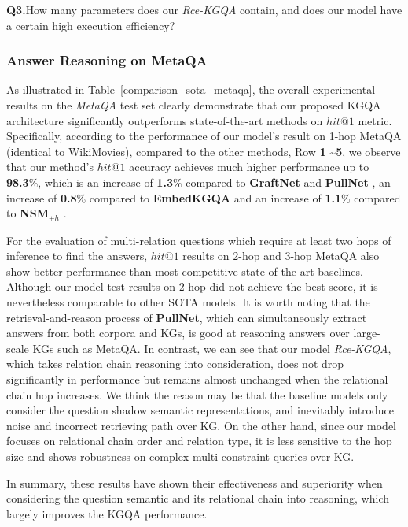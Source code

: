 \documentclass[pdflatex,sn-mathphys]{sn-jnl}%
\theoremstyle{thmstyleone}%
\theoremstyle{thmstyletwo}%
\theoremstyle{thmstylethree}%
\begin{document}
\textbf{Q3.}\quad How many parameters does our \textit{Rce-KGQA} contain, and does our model have a certain high execution efficiency?

\subsubsection{Answer Reasoning on MetaQA}
\label{ar_metaqa}
As illustrated in Table~\ref{comparison_sota_metaqa}, the overall experimental results on the \textit{MetaQA} test set clearly demonstrate that our proposed KGQA architecture significantly outperforms state-of-the-art methods on $hit@1$ metric. Specifically, according to the performance of our model's result on 1-hop MetaQA (identical to WikiMovies), compared to the other methods, Row \textbf{1} \textasciitilde \textbf{5}, we observe that our method's $hit@1$ accuracy achieves much higher performance up to \textbf{98.3}\%, which is an increase of \textbf{1.3}\% compared to \textbf{GraftNet} \cite{sun2018graftnet} and \textbf{PullNet} \cite{pullnet}, an increase of \textbf{0.8}\% compared to \textbf{EmbedKGQA} \cite{apoorv2020embedKGQA} and an increase of \textbf{1.1}\% compared to \textbf{NSM}$_{+h}$ \cite{he2021stu-teaQA}.

For the evaluation of multi-relation questions which require at least two hops of inference to find the answers, $hit@1$ results on 2-hop and 3-hop MetaQA also show better performance than most competitive state-of-the-art baselines. Although our model test results on 2-hop did not achieve the best score, it is nevertheless comparable to other SOTA models. It is worth noting that the retrieval-and-reason process of \textbf{PullNet}, which can simultaneously extract answers from both corpora and KGs, is good at reasoning answers over large-scale KGs such as MetaQA. In contrast, we can see that our model \textit{Rce-KGQA}, which takes relation chain reasoning into consideration, does not drop significantly in performance but remains almost unchanged when the relational chain hop increases. We think the reason may be that the baseline models only consider the question shadow semantic representations, and inevitably introduce noise and incorrect retrieving path over KG. On the other hand, since our model focuses on relational chain order and relation type, it is less sensitive to the hop size and shows robustness on complex multi-constraint queries over KG. 

In summary, these results have shown their effectiveness and superiority when considering the question semantic and its relational chain into reasoning, which largely improves the KGQA performance. 
\end{document}

